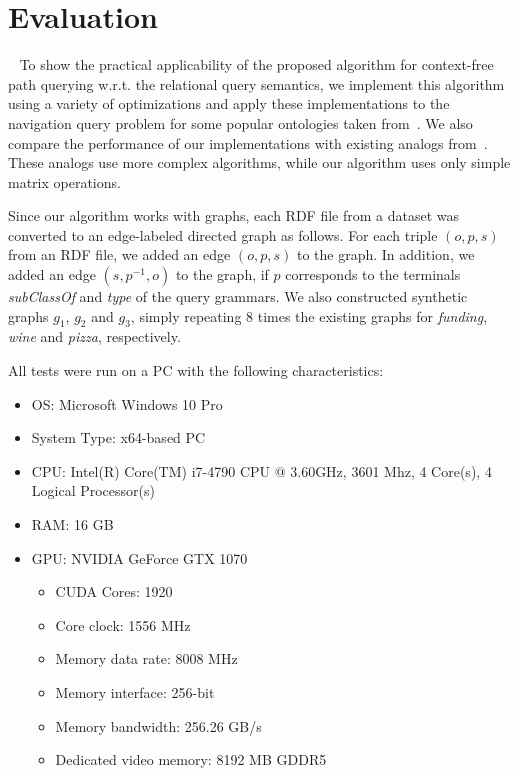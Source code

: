 \section{Evaluation} ~\label{section_evaluation}
To show the practical applicability of the proposed algorithm for context-free path querying w.r.t. the relational query semantics, we implement this algorithm using a variety of optimizations and apply these implementations to the navigation query problem for some popular ontologies taken from~\cite{RDF}. We also compare the performance of our implementations with existing analogs from~\cite{GLL,RDF}. These analogs use more complex algorithms, while our algorithm uses only simple matrix operations.

Since our algorithm works with graphs, each RDF file from a dataset was converted to an edge-labeled directed graph as follows. For each triple $(o,p,s)$ from an RDF file, we added an edge $(o,p,s)$ to the graph. In addition, we added an edge $(s,p^{-1},o)$ to the graph, if $p$ corresponds to the terminals \textit{subClassOf} and \textit{type} of the query grammars. We also constructed synthetic graphs $g_1$, $g_2$ and $g_3$, simply repeating $8$ times the existing graphs for \textit{funding}, \textit{wine} and \textit{pizza}, respectively.

All tests were run on a PC with the following characteristics:
\begin{itemize}
    \item OS: Microsoft Windows 10 Pro
    \item System Type: x64-based PC
    \item CPU: Intel(R) Core(TM) i7-4790 CPU @ 3.60GHz, 3601 Mhz, 4 Core(s), 4 Logical Processor(s)
    \item RAM: 16 GB
    \item GPU: NVIDIA GeForce GTX 1070
    \begin{itemize}
        \item CUDA Cores:		1920 
        \item Core clock:		1556 MHz 
        \item Memory data rate:	8008 MHz
        \item Memory interface:	256-bit 
        \item Memory bandwidth:	256.26 GB/s
        \item Dedicated video memory:	8192 MB GDDR5
    \end{itemize}
\end{itemize}

